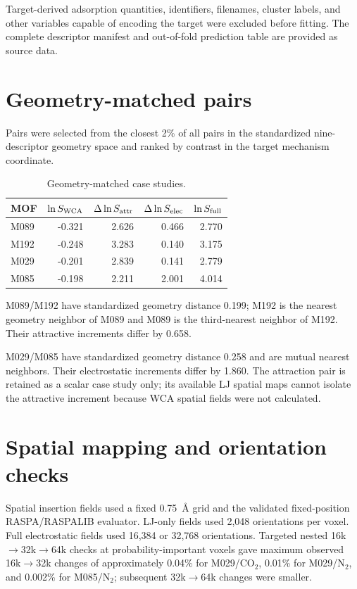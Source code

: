 \documentclass[11pt,a4paper]{article}
\begin{document}
Target-derived adsorption quantities, identifiers, filenames, cluster labels, and other variables capable of encoding the target were excluded before fitting. The complete descriptor manifest and out-of-fold prediction table are provided as source data.

\section{Geometry-matched pairs}

Pairs were selected from the closest 2\% of all pairs in the standardized nine-descriptor geometry space and ranked by contrast in the target mechanism coordinate.

\begin{table}[H]
\centering
\caption{Geometry-matched case studies.}
\begin{tabular}{lrrrr}
\toprule
MOF & $\ln S_{\rm WCA}$ & $\Delta\ln S_{\rm attr}$ & $\Delta\ln S_{\rm elec}$ & $\ln S_{\rm full}$\\
\midrule
M089 & -0.321 & 2.626 & 0.466 & 2.770\\
M192 & -0.248 & 3.283 & 0.140 & 3.175\\
M029 & -0.201 & 2.839 & 0.141 & 2.779\\
M085 & -0.198 & 2.211 & 2.001 & 4.014\\
\bottomrule
\end{tabular}
\end{table}

M089/M192 have standardized geometry distance 0.199; M192 is the nearest geometry neighbor of M089 and M089 is the third-nearest neighbor of M192. Their attractive increments differ by 0.658.

M029/M085 have standardized geometry distance 0.258 and are mutual nearest neighbors. Their electrostatic increments differ by 1.860. The attraction pair is retained as a scalar case study only; its available LJ spatial maps cannot isolate the attractive increment because WCA spatial fields were not calculated.

\section{Spatial mapping and orientation checks}

Spatial insertion fields used a fixed 0.75~\AA{} grid and the validated fixed-position RASPA/RASPALIB evaluator. LJ-only fields used 2,048 orientations per voxel. Full electrostatic fields used 16,384 or 32,768 orientations. Targeted nested 16k$\rightarrow$32k$\rightarrow$64k checks at probability-important voxels gave maximum observed 16k$\rightarrow$32k changes of approximately 0.04\% for M029/CO$_2$, 0.01\% for M029/N$_2$, and 0.002\% for M085/N$_2$; subsequent 32k$\rightarrow$64k changes were smaller.
\end{document}
